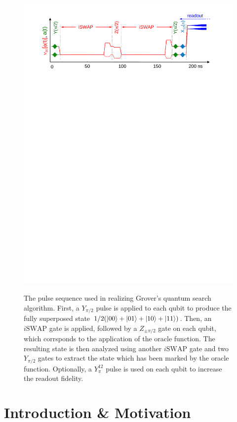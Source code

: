 \begin{figure}
	\centering
		\includegraphics[width=1.\textwidth]{./material/papers/grover/figures/grover_algorithm_pulse_sequence}
	\label{fig:Grover3}
	\caption[Pulse sequence used for implementing Grovers search algorithm]{The pulse sequence used in realizing Grover's quantum search algorithm. First, a $Y_{\pi/2}$ pulse is applied to each qubit to produce the fully superposed state $1/2(\left| 00 \right>+\left| 01 \right>+\left| 10 \right>+\left| 11 \right>)$. Then, an $i\mathrm{SWAP}$ gate is applied, followed by a $Z_{\pm \pi /2}$ gate on each qubit, which corrsponds to the application of the oracle function. The resulting state is then analyzed using another $i\mathrm{SWAP}$ gate and two $Y_{\pi/2}$ gates to extract the state which has been marked by the oracle function. Optionally, a $Y^{12}_{\pi}$ pulse is used on each qubit to increase the readout fidelity.}
\end{figure}

\section{Introduction \& Motivation}

